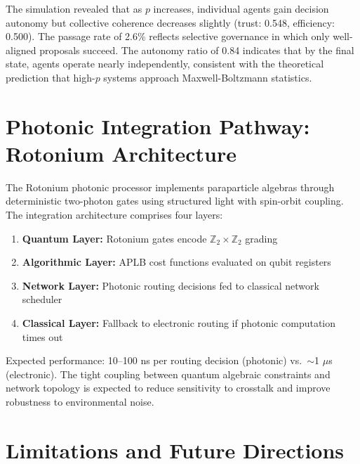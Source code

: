 \documentclass[smallextended]{svjour3}
\begin{document}
The simulation revealed that as $p$ increases, individual agents gain decision autonomy but collective coherence decreases slightly (trust: 0.548, efficiency: 0.500). The passage rate of 2.6\% reflects selective governance in which only well-aligned proposals succeed. The autonomy ratio of 0.84 indicates that by the final state, agents operate nearly independently, consistent with the theoretical prediction that high-$p$ systems approach Maxwell-Boltzmann statistics.

\section{Photonic Integration Pathway: Rotonium Architecture}

The Rotonium photonic processor implements paraparticle algebras through deterministic two-photon gates using structured light with spin-orbit coupling. The integration architecture comprises four layers:

\begin{enumerate}
\item \textbf{Quantum Layer:} Rotonium gates encode $\mathbb{Z}_2 \times \mathbb{Z}_2$ grading
\item \textbf{Algorithmic Layer:} APLB cost functions evaluated on qubit registers
\item \textbf{Network Layer:} Photonic routing decisions fed to classical network scheduler
\item \textbf{Classical Layer:} Fallback to electronic routing if photonic computation times out
\end{enumerate}

Expected performance: 10–100 ns per routing decision (photonic) vs.\ $\sim$1 $\mu$s (electronic). The tight coupling between quantum algebraic constraints and network topology is expected to reduce sensitivity to crosstalk and improve robustness to environmental noise.

\section{Limitations and Future Directions}
\end{document}
